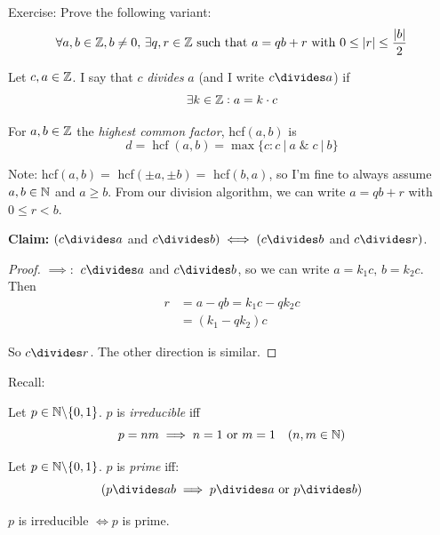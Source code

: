 \documentclass[10pt]{scrartcl}
\DeclareMathOperator{\hcf}{hcf}
\begin{document}
Exercise: Prove the following variant: \[\forall a,b \in\mathbb{Z}, b \neq 0,\,\exists q,r\in\mathbb{Z}\text{ such that }a = qb + r\text{ with }0 \leq |r| \leq \frac{|b|}{2}\]

\begin{definition}
Let $c,a \in \mathbb{Z}$. I say that $c$ \emph{divides} $a$ (and I write $c \divides a$) if \[\exists k\in\mathbb{Z} : a = k\cdot c\]	
\end{definition}\vspace*{5pt}

\begin{definition}
For $a,b \in\mathbb{Z}$ the \emph{highest common factor}, hcf$(a,b)$ is 
\[d = \hcf(a,b) = \max\{c: c ~|~ a \;\&\; c ~|~ b\}\]
\end{definition}



Note: hcf$(a,b) = $ hcf$(\pm a,\pm b) = $ hcf$(b,a)$, so I'm fine to always assume $a,b \in\mathbb{N}$ and $a \geq b$. From our division algorithm, we can write $a = qb + r$ with $ 0 \leq r < b$.

\textbf{Claim:} $(c \divides a$ and $c \divides b) \iff (c \divides b$ and $c \divides r)$. 	

\begin{proof}$\implies:$
$c \divides a$ and $c \divides b$, so we can write  $a = k_1c,\, b = k_2c$. Then
\[\begin{aligned}r &= a - qb = k_1c - qk_2c\\ &= (k_1-qk_2)c\end{aligned}\]

So $c \divides r$. 
The other direction is similar. 
\end{proof}

Recall:\\

\begin{definition}
Let $p \in\mathbb{N}\backslash \{0,1\}$. $p$ is \emph{irreducible} iff
\[p = nm \implies n = 1 \text{ or } m = 1\quad (n,m \in\mathbb{N})\]
\end{definition}\vsp

\begin{definition}
Let $p\in\mathbb{N} \backslash \{0,1\}$. $p$ is \emph{prime} iff:
\[(p \divides ab \implies p \divides a \text{ or } p\divides b)\]	
\end{definition}\vsp

\begin{proposition}
$p$ is irreducible $\iff p$ is prime.	
\end{proposition}
\end{document}
